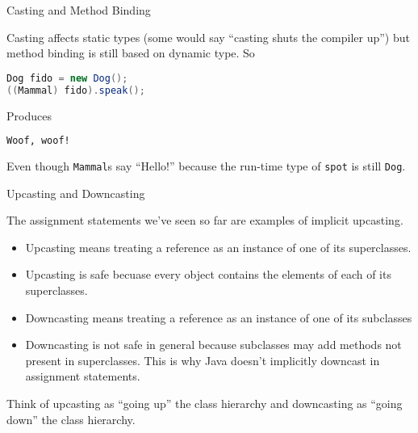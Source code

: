 \documentclass{beamer}
\begin{document}
\begin{frame}[fragile]{Casting and Method Binding}


Casting affects static types (some would say ``casting shuts the compiler up'') but method binding is still based on dynamic type.  So
\begin{lstlisting}[language=Java]
Dog fido = new Dog();
((Mammal) fido).speak();
\end{lstlisting}
Produces
\begin{lstlisting}[language=bash]
Woof, woof!
\end{lstlisting}
Even though {\tt Mammal}s say ``Hello!'' because the run-time type of {\tt spot} is still {\tt Dog}.

\end{frame}

\begin{frame}[fragile]{Upcasting and Downcasting}


The assignment statements we've seen so far are examples of implicit upcasting.
\begin{itemize}
\item Upcasting means treating a reference as an instance of one of its superclasses.
\item Upcasting is safe becuase every object contains the elements of each of its superclasses.
\item Downcasting means treating a reference as an instance of one of its subclasses
\item Downcasting is not safe in general because subclasses may add methods not present in superclasses.  This is why Java doesn't implicitly downcast in assignment statements.
\end{itemize}
Think of upcasting as ``going up'' the class hierarchy and downcasting as ``going down'' the class hierarchy.


\end{frame}
\end{document}
